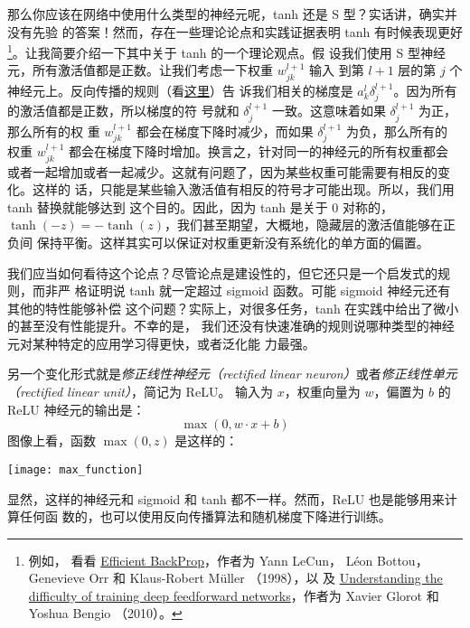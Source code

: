 那么你应该在网络中使用什么类型的神经元呢，tanh 还是 S 型？实话讲，确实并没有先验
的答案！然而，存在一些理论论点和实践证据表明 tanh 有时候表现更好\footnote{例如，
  看看 \href{http://yann.lecun.com/exdb/publis/pdf/lecun-98b.pdf}{Efficient
    BackProp}，作者为 Yann LeCun， Léon Bottou， Genevieve Orr 和 Klaus-Robert
  Müller （1998），以
  及
  \href{http://jmlr.org/proceedings/papers/v9/glorot10a/glorot10a.pdf}{Understanding
    the difficulty of training deep feedforward networks}，作者为 Xavier Glorot
  和 Yoshua Bengio （2010）。}。让我简要介绍一下其中关于 tanh 的一个理论观点。假
设我们使用 S 型神经元，所有激活值都是正数。让我们考虑一下权重 $w_{jk}^{l+1}$ 输入
到第 $l+1$ 层的第 $j$ 个神经元上。反向传播的规则（看\hyperref[eq:bp4]{这里}）告
诉我们相关的梯度是 $a_k^l\delta_j^{l+1}$。因为所有的激活值都是正数，所以梯度的符
号就和 $\delta_j^{l+1}$ 一致。这意味着如果 $\delta_j^{l+1}$ 为正，那么所有的权
重 $w_{jk}^{l+1}$ 都会在梯度下降时减少，而如果 $\delta_j^{l+1}$ 为负，那么所有的
权重 $w_{jk}^{l+1}$ 都会在梯度下降时增加。换言之，针对同一的神经元的所有权重都会
或者一起增加或者一起减少。这就有问题了，因为某些权重可能需要有相反的变化。这样的
话，只能是某些输入激活值有相反的符号才可能出现。所以，我们用 tanh 替换就能够达到
这个目的。因此，因为 tanh 是关于 $0$
对称的，$\tanh(-z) = -\tanh(z)$，我们甚至期望，大概地，隐藏层的激活值能够在正负间
保持平衡。这样其实可以保证对权重更新没有系统化的单方面的偏置。

我们应当如何看待这个论点？尽管论点是建设性的，但它还只是一个启发式的规则，而非严
格证明说 tanh 就一定超过 sigmoid 函数。可能 sigmoid 神经元还有其他的特性能够补偿
这个问题？实际上，对很多任务，tanh 在实践中给出了微小的甚至没有性能提升。不幸的是，
我们还没有快速准确的规则说哪种类型的神经元对某种特定的应用学习得更快，或者泛化能
力最强。

另一个变化形式就是\emph{修正线性神经元（rectified linear
    neuron）}或者\emph{修正线性单元（rectified linear unit）}，简记为 ReLU。
输入为 $x$，权重向量为 $w$，偏置为 $b$ 的 ReLU 神经元的输出是：
\begin{equation}
  \max(0, w \cdot x+b)
  \label{eq:112}\tag{112}
\end{equation}
图像上看，函数 $\max(0,z)$ 是这样的：
\begin{center}
  \texttt{[image: max\_function]}
\end{center}

显然，这样的神经元和 sigmoid 和 tanh 都不一样。然而，ReLU 也是能够用来计算任何函
数的，也可以使用反向传播算法和随机梯度下降进行训练。

